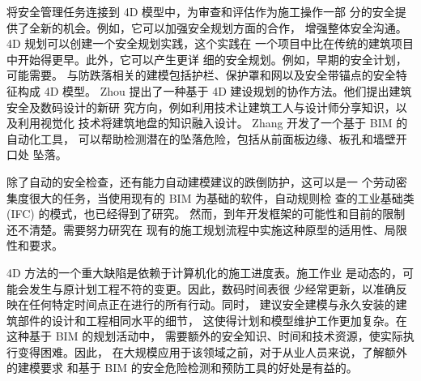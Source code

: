 将安全管理任务连接到 4D 模型中，为审查和评估作为施工操作一部
分的安全提供了全新的机会。例如，它可以加强安全规划方面的合作，
增强整体安全沟通。4D 规划可以创建一个安全规划实践，这个实践在
一个项目中比在传统的建筑项目中开始得更早。此外，它可以产生更详
细的安全规划。例如，早期的安全计划，可能需要。
与防跌落相关的建模包括护栏、保护罩和网以及安全带锚点的安全特征构成 4D 模型。
Zhou 提出了一种基于 4D 建设规划的协作方法。他们提出建筑安全及数码设计的新研
究方向，例如利用技术让建筑工人与设计师分享知识，以及利用视觉化
技术将建筑地盘的知识融入设计。 Zhang 开发了一个基于 BIM 的自动化工具，
可以帮助检测潜在的坠落危险，包括从前面板边缘、板孔和墙壁开口处
坠落。

除了自动的安全检查，还有能力自动建模建议的跌倒防护，这可以是一
个劳动密集度很大的任务，当使用现有的 BIM 为基础的软件，自动规则检
查的工业基础类 (IFC) 的模式，也已经得到了研究。
然而，到年开发框架的可能性和目前的限制还不清楚。需要努力研究在
现有的施工规划流程中实施这种原型的适用性、局限性和要求。

4D 方法的一个重大缺陷是依赖于计算机化的施工进度表。施工作业
是动态的，可能会发生与原计划工程不符的变更。因此，数码时间表很
少经常更新，以准确反映在任何特定时间点正在进行的所有行动。同时，
建议安全建模与永久安装的建筑部件的设计和工程相同水平的细节，
这使得计划和模型维护工作更加复杂。在这种基于 BIM 的规划活动中，
需要额外的安全知识、时间和技术资源，使实际执行变得困难。因此，
在大规模应用于该领域之前，对于从业人员来说，了解额外的建模要求
和基于 BIM 的安全危险检测和预防工具的好处是有益的。